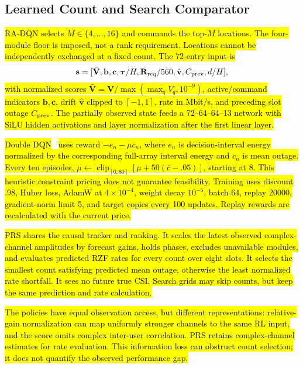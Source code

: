 \documentclass[letterpaper,conference]{IEEEtran}
\newcommand{\rev}[1]{\hl{#1}}
\newcommand{\rev}[1]{\hl{#1}}
\begin{document}
\subsection{Learned Count and Search Comparator}
\rev{RA-DQN selects $M\in\{4,\ldots,16\}$ and commands the top-$M$ locations. The four-module floor is imposed, not a rank requirement. Locations cannot be independently exchanged at a fixed count. The 72-entry input is}
\begin{equation}
\mathbf s=[\bar{\mathbf V},\mathbf b,\mathbf c,\boldsymbol\tau/H,
\mathbf R_{\rm req}/560,\hat{\mathbf v},C_{\rm prev},d/H],
\end{equation}
\rev{with normalized scores $\bar{\mathbf V}=\mathbf V/\max(\max_qV_q,10^{-9})$, active/command indicators $\mathbf b,\mathbf c$, drift $\hat{\mathbf v}$ clipped to $[-1,1]$, rate in Mbit/s, and preceding slot outage $C_{\rm prev}$. The partially observed state feeds a 72--64--64--13 network with SiLU hidden activations and layer normalization after the first linear layer.}

\rev{Double DQN}~\cite{vanhasselt2016} \rev{uses reward $-e_n-\mu c_n$, where $e_n$ is decision-interval energy normalized by the corresponding full-array interval energy and $c_n$ is mean outage. Every ten episodes, $\mu\leftarrow\operatorname{clip}_{[0,80]}[\mu+50(\bar c-.05)]$, starting at 8. This heuristic constraint pricing does not guarantee feasibility. Training uses discount .98, Huber loss, AdamW at $4\times10^{-4}$, weight decay $10^{-5}$, batch 64, replay 20000, gradient-norm limit 5, and target copies every 100 updates. Replay rewards are recalculated with the current price.}

\rev{PRS shares the causal tracker and ranking. It scales the latest observed complex-channel amplitudes by forecast gains, holds phases, excludes unavailable modules, and evaluates predicted RZF rates for every count over eight slots. It selects the smallest count satisfying predicted mean outage, otherwise the least normalized rate shortfall. It sees no future true CSI. Search grids may skip counts, but keep the same prediction and rate calculation.}

\rev{The policies have equal observation access, but different representations: relative-gain normalization can map uniformly stronger channels to the same RL input, and the score omits complex inter-user correlation. PRS retains complex-channel estimates for rate evaluation. This information loss can obstruct count selection; it does not quantify the observed performance gap.}
\end{document}
